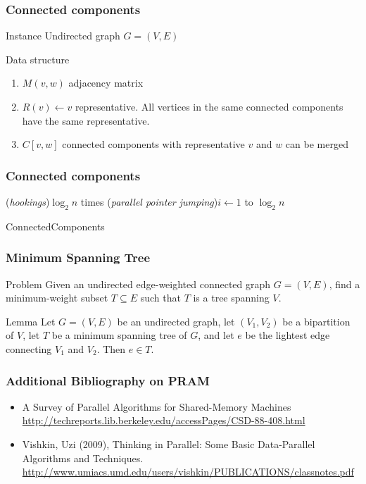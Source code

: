 \documentclass[12pt,aspectratio=169]{beamer}
\begin{document}
\begin{frame}\frametitle{Connected components}
\begin{block}{Instance}
Undirected graph $G=(V,E)$
\end{block}
\begin{block}{Data structure}
\begin{enumerate} 
\item
$M(v,w)$ adjacency matrix
\item
$R(v) \gets v$ representative.    
All vertices in the same connected components have the same representative.    
\item
$C[v,w]$ connected components with representative $v$ and $w$ can be merged
\end{enumerate}
\end{block}
\end{frame}

\begin{frame}\frametitle{Connected components}
  \begin{algorithm}[H]
    \For(\emph{hookings}){$\log_{2} n$ times}{
    \For(\emph{parallel pointer jumping}){$i\gets 1$ to $\log_{2} n$}{
    }
  }
  \caption{ConnectedComponents}
  \end{algorithm}
\end{frame}


\begin{frame}\frametitle{Minimum Spanning Tree}
\begin{block}{Problem}
Given an undirected edge-weighted connected graph $G=(V,E)$, find a
minimum-weight subset
$T\subseteq E$ such that $T$ is a tree spanning $V$.    
\end{block}

\begin{block}{Lemma}
Let $G=(V,E)$ be an undirected graph, let $(V_{1}, V_{2})$ be a
bipartition of $V$, let $T$ be a minimum spanning tree of $G$, and let
$e$ be the lightest edge connecting $V_{1}$ and $V_{2}$.    
Then $e\in T$.    
\end{block}
\end{frame}


\begin{frame}\frametitle{Additional Bibliography on PRAM}

    \begin{itemize}[<.->]
    \item
A Survey of Parallel Algorithms for Shared-Memory Machines
\url{http://techreports.lib.berkeley.edu/accessPages/CSD-88-408.html}
    \item
Vishkin, Uzi (2009), Thinking in Parallel: Some Basic Data-Parallel Algorithms and
Techniques.    
\url{http://www.umiacs.umd.edu/users/vishkin/PUBLICATIONS/classnotes.pdf}    
\end{itemize}
\end{frame}
\end{document}
